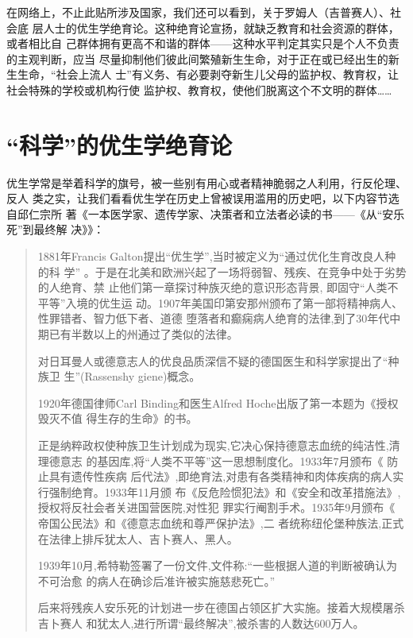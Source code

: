 在网络上，不止此贴所涉及国家，我们还可以看到，关于罗姆人（吉普赛人）、社会底
层人士的优生学绝育论。这种绝育论宣扬，就缺乏教育和社会资源的群体，或者相比自
己群体拥有更高不和谐的群体——这种水平判定其实只是个人不负责的主观判断，应当
尽量抑制他们彼此间繁殖新生生命，对于正在或已经出生的新生生命，“社会上流人
士”有义务、有必要剥夺新生儿父母的监护权、教育权，让社会特殊的学校或机构行使
监护权、教育权，使他们脱离这个不文明的群体……

\section{“科学”的优生学绝育论}

优生学常是举着科学的旗号，被一些别有用心或者精神脆弱之人利用，行反伦理、反人
类之实，让我们看看优生学在历史上曾被误用滥用的历史吧，以下内容节选自邱仁宗所
著《一本医学家、遗传学家、决策者和立法者必读的书——《从“安乐死”到最终解
决》》\cite{yousheng}：

\begin{quotation}
  1881年Francis Galton提出“优生学”,当时被定义为“通过优化生育改良人种的科
  学” 。于是在北美和欧洲兴起了一场将弱智、残疾、在竞争中处于劣势的人绝育、禁
  止他们第一章探讨种族灭绝的意识形态背景, 即固守“人类不平等”入境的优生运
  动。1907年美国印第安那州颁布了第一部将精神病人、性罪错者、智力低下者、道德
  堕落者和癫痫病人绝育的法律,到了30年代中期已有半数以上的州通过了类似的法律。

  对日耳曼人或德意志人的优良品质深信不疑的德国医生和科学家提出了“种族卫
  生”(Rassenshy giene)概念。

  1920年德国律师Carl Binding和医生Alfred Hoche出版了第一本题为《授权毁灭不值
  得生存的生命》的书。

  正是纳粹政权使种族卫生计划成为现实,它决心保持德意志血统的纯洁性,清理德意志
  的基因库,将“人类不平等”这一思想制度化。1933年7月颁布《 防止具有遗传性疾病
  后代法》,即绝育法,对患有各类精神和肉体疾病的病人实行强制绝育。1933年11月颁
  布《反危险惯犯法》和《安全和改革措施法》, 授权将反社会者关进国营医院,对性犯
  罪实行阉割手术。1935年9月颁布《 帝国公民法》和《德意志血统和尊严保护法》,二
  者统称纽伦堡种族法,正式在法律上排斥犹太人、吉卜赛人、黑人。

  1939年10月,希特勒签署了一份文件,文件称:“一些根据人道的判断被确认为不可治愈
  的病人在确诊后准许被实施慈悲死亡。”

  后来将残疾人安乐死的计划进一步在德国占领区扩大实施。接着大规模屠杀吉卜赛人
  和犹太人,进行所谓“最终解决”,被杀害的人数达600万人。
\end{quotation}

